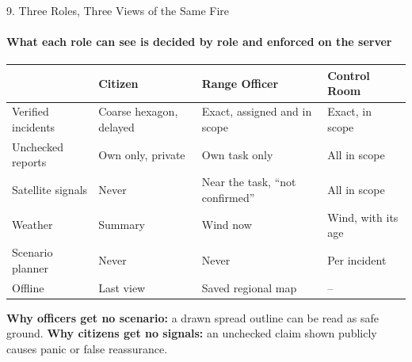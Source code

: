 \begin{frame}{9. Three Roles, Three Views of the Same Fire}
\framesubtitle{What each role can see is decided by role and enforced on the server}
\scriptsize
\renewcommand{\arraystretch}{1.3}
\begin{center}
\begin{tabular}{p{} p{} p{} p{}}
\toprule
 & \textbf{Citizen} & \textbf{Range Officer} & \textbf{Control Room} \\
\midrule
Verified incidents & Coarse hexagon, delayed & Exact, assigned and in scope & Exact, in scope \\
Unchecked reports & Own only, private & Own task only & All in scope \\
Satellite signals & Never & Near the task, ``not confirmed'' & All in scope \\
Weather & Summary & Wind now & Wind, with its age \\
Scenario planner & Never & Never & Per incident \\
Offline & Last view & Saved regional map & -- \\
\bottomrule
\end{tabular}
\end{center}
\vspace{0.1cm}
\textbf{Why officers get no scenario:} a drawn spread outline can be read as safe ground.
\textbf{Why citizens get no signals:} an unchecked claim shown publicly causes panic or false reassurance.
\end{frame}

